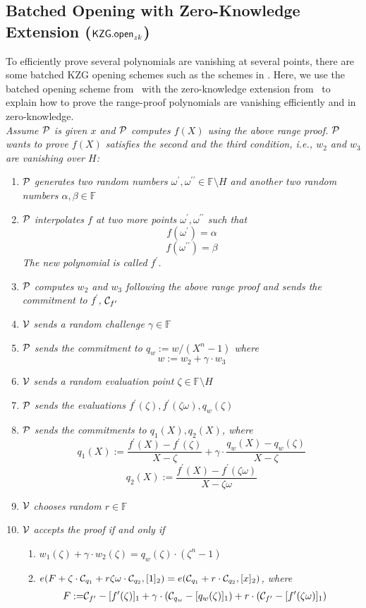 \subsection{Batched Opening with Zero-Knowledge Extension ($\mathsf{KZG.open}_{zk}$)}
\label{sec:kgzzkp}
To efficiently prove several polynomials are vanishing at several points, there are some batched KZG opening schemes such as the schemes in \cite{plonk,bdfg,fflonk}. Here, we use the batched opening scheme from~\cite{plonk} with the zero-knowledge extension from~\cite{rangeproof} to explain how to prove the range-proof polynomials are vanishing efficiently and in zero-knowledge. \\
\textit{Assume $\mathcal{P}$ is given $x$ and $\mathcal{P}$ computes $f(X)$ using the above range proof. $\mathcal{P}$ wants to prove $f(X)$ satisfies the second and the third condition, i.e., $w_2$ and $w_3$ are vanishing over $H$:}
\begin{enumerate}
    \item $\mathcal{P}$ \textit{generates two random numbers $\omega^{\prime},\omega^{\prime\prime}\in\mathbb{F}\setminus{H}$ and another two random numbers $\alpha,\beta\in\mathbb{F}$}
    \item $\mathcal{P}$ \textit{interpolates $f$ at two more points ${\omega^{\prime},\omega^{\prime\prime}}$ such that}
    \[ f(\omega^{\prime})=\alpha \]
    \[ f(\omega^{\prime\prime})=\beta \]
    \textit{The new polynomial is called $f^\prime$.}
    \item $\mathcal{P}$ \textit{computes $w_2$ and $w_3$ following the above range proof and sends the commitment to $f^\prime$,} $\mathcal{C}_{f^\prime}$
    \item $\mathcal{V}$ \textit{sends a random challenge $\gamma\in\mathbb{F}$}
    \item $\mathcal{P}$ \textit{sends the commitment to $q_w:=w/(X^n-1)$ where}
    \[ w:=w_2+\gamma\cdot{w_3} \]
    \item $\mathcal{V}$ \textit{sends a random evaluation point $\zeta\in\mathbb{F}\setminus{H}$}
    \item $\mathcal{P}$ \textit{sends the evaluations $f^\prime(\zeta),f^\prime(\zeta\omega),q_w(\zeta)$}
    \item $\mathcal{P}$ \textit{sends the commitments to $q_1(X),q_2(X)$, where}
    \[ q_1(X):=\frac{f^\prime(X)-f^\prime(\zeta)}{X-\zeta}+\gamma\cdot\frac{q_w(X)-q_w(\zeta)}{X-\zeta} \]
    \[ q_2(X):=\frac{f^\prime(X)-f^\prime(\zeta\omega)}{X-\zeta\omega} \]
    \item $\mathcal{V}$ \textit{chooses random $r\in\mathbb{F}$}
    \item $\mathcal{V}$ \textit{accepts the proof if and only if}
    \begin{enumerate}
    	\item $w_1(\zeta)+\gamma\cdot{w_2(\zeta)}=q_w(\zeta)\cdot(\zeta^n-1)$
    	\item $e(F+\zeta\cdot\mathcal{C}_{q_1}+r\zeta\omega\cdot\mathcal{C}_{q_2},[1]_2)=e(\mathcal{C}_{q_1}+r\cdot\mathcal{C}_{q_2},[x]_2)$\textit{, where}
    	\begin{align*}
    		F:=&\mathcal{C}_{f^\prime}-[f^\prime(\zeta)]_1+\gamma\cdot(\mathcal{C}_{q_w}-[q_w(\zeta)]_1)+r\cdot(\mathcal{C}_{f^\prime}-[f^\prime(\zeta\omega)]_1)
    	\end{align*}
    \end{enumerate}
\end{enumerate}

